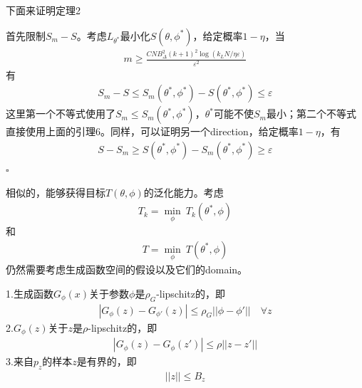             \par
            下面来证明定理2
            \begin{Proof}
            首先限制$S_m - S$。考虑$L_{\theta^*}$最小化$S(\theta,\phi^*)$，给定概率$1-\eta$，当
            \begin{align*}
            m \geqslant \frac{CNB_\Delta^2(k+1)^2\log (k_LN/\eta\varepsilon)}{\varepsilon^2}
            \end{align*}
            有
            \begin{align*}
            S_m - S \leqslant S_m(\theta^*,\phi^*) - S(\theta^*,\phi^*) \leqslant \varepsilon
            \end{align*}
            这里第一个不等式使用了$S_m \leqslant S_m(\theta^*,\phi^*)$，$\theta^*$可能不使$S_m$最小；第二个不等式直接使用上面的引理6。同样，可以证明另一个direction，给定概率$1-\eta$，有
            \begin{align*}
            S-S_m \geqslant S(\theta^*,\phi^*) - S_m(\theta^*,\phi^*) \geqslant \varepsilon
            \end{align*}
            $\square$
            \end{Proof}
            \par
            相似的，能够获得目标$T(\theta,\phi)$的泛化能力。考虑
            \begin{align*}
            T_k = \min_\phi \ T_k(\theta^*,\phi)
            \end{align*}
            和
            \begin{align*}
            T = \min_\phi \ T(\theta^*,\phi)
            \end{align*}
            仍然需要考虑生成函数空间的假设以及它们的domain。
            \begin{Assumption}[3]
            1.生成函数$G_\phi(x)$关于参数$\phi$是$\rho_G$-lipschitz的，即
            \begin{align*}
            |G_\phi(z) - G_{\phi'}(z)| \leqslant \rho_G||\phi - \phi'||\quad \forall z
            \end{align*}
            2.$G_\phi(z)$关于$z$是$\rho$-lipschitz的，即
            \begin{align*}
            |G_\phi(z) - G_\phi(z')| \leqslant \rho||z - z'||
            \end{align*}
            3.来自$p_z$的样本$z$是有界的，即
            \begin{align*}
            ||z|| \leqslant B_z
            \end{align*}

            \end{Assumption}
